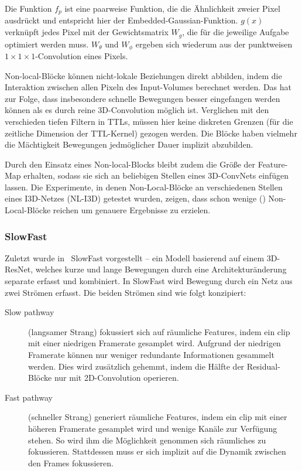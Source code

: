 Die Funktion $f_p$ ist eine paarweise Funktion, die die Ähnlichkeit zweier Pixel ausdrückt und entspricht hier der Embedded-Gaussian-Funktion.
$g(x)$ verknüpft jedes Pixel mit der Gewichtsmatrix $W_g$, die für die jeweilige Aufgabe optimiert werden muss.
$W_\theta$ und $W_\phi$ ergeben sich wiederum aus der punktweisen $1 \times 1 \times 1$-Convolution eines Pixels.

Non-local-Blöcke können nicht-lokale Beziehungen direkt abbilden, indem die Interaktion zwischen allen Pixeln des Input-Volumes berechnet werden.
Das hat zur Folge, dass insbesondere schnelle Bewegungen besser eingefangen werden können als es durch reine 3D-Convolution möglich ist.
Verglichen mit den verschieden tiefen Filtern in TTLs, müssen hier keine diskreten Grenzen (für die zeitliche Dimension der TTL-Kernel) gezogen werden.
Die Blöcke haben vielmehr die Mächtigkeit Bewegungen jedmöglicher Dauer implizit abzubilden.

Durch den Einsatz eines Non-local-Blocks bleibt zudem die Größe der Feature-Map erhalten, sodass sie sich an beliebigen Stellen eines 3D-ConvNets einfügen lassen.
Die Experimente, in denen Non-Local-Blöcke an verschiedenen Stellen eines I3D-Netzes (NL-I3D) getestet wurden, zeigen, dass schon wenige () Non-Local-Blöcke reichen um genauere Ergebnisse zu erzielen.

\subsubsection*{SlowFast}

Zuletzt wurde in~\cite{Feichtenhofer18} SlowFast vorgestellt -- ein Modell basierend auf einem 3D-ResNet, welches kurze und lange Bewegungen durch eine Architekturänderung separate erfasst und kombiniert.
In SlowFast wird Bewegung durch ein Netz aus zwei Strömen erfasst.
Die beiden Strömen sind wie folgt konzipiert:

\begin{description}
    \item[Slow pathway] (langsamer Strang) fokussiert sich auf räumliche Features, indem ein \gls{clip} mit einer niedrigen Framerate gesamplet wird.
    Aufgrund der niedrigen Framerate können nur weniger redundante Informationen gesammelt werden.
    Dies wird zusätzlich gehemmt, indem die Hälfte der Residual-Blöcke nur mit 2D-Convolution operieren.
    \item[Fast pathway] (schneller Strang) generiert räumliche Features, indem ein \gls{clip} mit einer höheren Framerate gesamplet wird und wenige Kanäle zur Verfügung stehen.
    So wird ihm die Möglichkeit genommen sich räumliches zu fokussieren.
    Stattdessen muss er sich implizit auf die Dynamik zwischen den Frames fokussieren.
\end{description}

